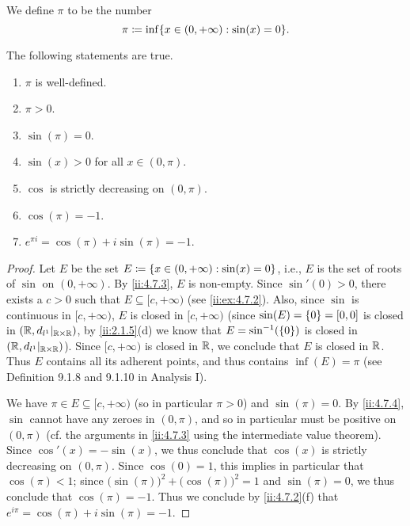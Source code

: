 \begin{defn}\label{ii:4.7.4}
  We define \(\pi\) to be the number
  \[
    \pi \coloneqq \inf\set{x \in (0, +\infty) : \sin(x) = 0}.
  \]
\end{defn}

\begin{ac}\label{ii:ac:4.7.2}
  The following statements are true.
  \begin{enumerate}
    \item \(\pi\) is well-defined.
    \item \(\pi > 0\).
    \item \(\sin(\pi) = 0\).
    \item \(\sin(x) > 0\) for all \(x \in (0, \pi)\).
    \item \(\cos\) is strictly decreasing on \((0, \pi)\).
    \item \(\cos(\pi) = -1\).
    \item \(e^{\pi i} = \cos(\pi) + i \sin(\pi) = -1\).
  \end{enumerate}
\end{ac}

\begin{proof}
  Let \(E\) be the set \(E \coloneqq \left\lbrace x \in (0, +\infty) : \sin(x) = 0\right\rbrace\), i.e., \(E\) is the set of roots of \(\sin\) on \((0, +\infty)\).
  By \cref{ii:4.7.3}, \(E\) is non-empty.
  Since \(\sin'(0) > 0\), there exists a \(c > 0\) such that \(E \subseteq [c, +\infty)\) (see \cref{ii:ex:4.7.2}).
  Also, since \(\sin\) is continuous in \([c, +\infty)\), \(E\) is closed in \([c, +\infty)\)
  (since \(\sin(E) = \left\lbrace0\right\rbrace = [0, 0]\) is closed in \((\mathbb{R}, d_{l^1}|_{\mathbb{R} \times \mathbb{R}})\), by \cref{ii:2.1.5}(d) we know that \(E = \sin^{-1}(\left\lbrace0\right\rbrace)\) is closed in \((\mathbb{R}, d_{l^1}|_{\mathbb{R} \times \mathbb{R}})\)).
  Since \([c, +\infty)\) is closed in \(\mathbb{R}\), we conclude that \(E\) is closed in \(\mathbb{R}\).
  Thus \(E\) contains all its adherent points, and thus contains \(\inf(E) = \pi\) (see Definition 9.1.8 and 9.1.10 in Analysis I).

  We have \(\pi \in E \subseteq [c, +\infty)\) (so in particular \(\pi > 0\)) and \(\sin(\pi) = 0\).
  By \cref{ii:4.7.4}, \(\sin\) cannot have any zeroes in \((0, \pi)\), and so in particular must be positive on \((0, \pi)\)
  (cf. the arguments in \cref{ii:4.7.3} using the intermediate value theorem).
  Since \(\cos'(x) = -\sin(x)\), we thus conclude that \(\cos(x)\) is strictly decreasing on \((0, \pi)\).
  Since \(\cos(0) = 1\), this implies in particular that \(\cos(\pi) < 1\);
  since \(\big(\sin(\pi)\big)^2 + \big(\cos(\pi)\big)^2 = 1\) and \(\sin(\pi) = 0\), we thus conclude that \(\cos(\pi) = -1\).
  Thus we conclude by \cref{ii:4.7.2}(f) that \(e^{i \pi} = \cos(\pi) + i \sin(\pi) = -1\).
\end{proof}

